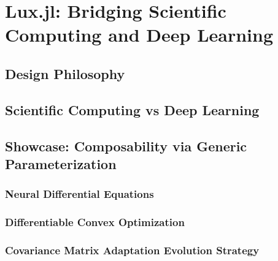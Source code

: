\chapter{Lux.jl: Bridging Scientific Computing and Deep Learning}
\label{chapter:lux_bridging_scientific_computing_and_deep_learning}


\section{Design Philosophy}
\label{sec:design_philosophy}

\section{Scientific Computing vs Deep Learning}
\label{sec:scientific_computing_vs_deep_learning}

\section{Showcase: Composability via Generic Parameterization}
\label{sec:composability}

\subsection{Neural Differential Equations}
\label{subsec:differential_equations_lux}

\subsection{Differentiable Convex Optimization}
\label{subsec:convex_optimization_lux}

\subsection{Covariance Matrix Adaptation Evolution Strategy}
\label{subsec:evolutionary_alg_lux}

\inputminted[linenos, fontsize=\footnotesize]{julia}{../code/cmaes.jl}

